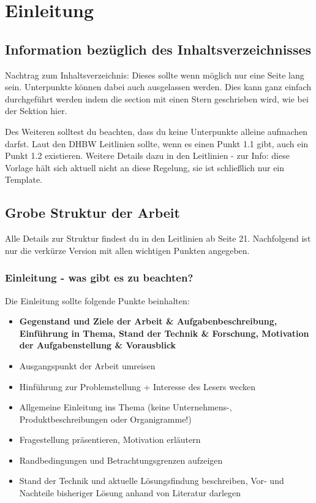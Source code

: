 \chapter{Einleitung}

\section*{Information bezüglich des Inhaltsverzeichnisses}
Nachtrag zum Inhaltsverzeichnis: Dieses sollte wenn möglich nur eine Seite lang sein. Unterpunkte können dabei auch ausgelassen werden. Dies kann ganz einfach durchgeführt werden indem die section mit einen Stern geschrieben wird, wie bei der Sektion hier.

Des Weiteren solltest du beachten, dass du keine Unterpunkte alleine aufmachen darfst. Laut den DHBW Leitlinien sollte, wenn es einen Punkt 1.1 gibt, auch ein Punkt 1.2 existieren. Weitere Details dazu in den Leitlinien - zur Info: diese Vorlage hält sich aktuell nicht an diese Regelung, sie ist schließlich nur ein Template.

\section{Grobe Struktur der Arbeit}
Alle Details zur Struktur findest du in den Leitlinien ab Seite 21. Nachfolgend ist nur die verkürze Version mit allen wichtigen Punkten angegeben.

\subsection{Einleitung - was gibt es zu beachten?}
Die Einleitung sollte folgende Punkte beinhalten:
\begin{itemize}
\item \textbf{Gegenstand und Ziele der Arbeit \& Aufgabenbeschreibung, Einführung in Thema, Stand der Technik \& Forschung, Motivation der Aufgabenstellung \& Vorausblick}
\item Ausgangspunkt der Arbeit umreisen
\item Hinführung zur Problemstellung + Interesse des Lesers wecken
\item Allgemeine Einleitung ins Thema (keine Unternehmens-, Produktbeschreibungen oder Organigramme!)
\item Fragestellung präsentieren, Motivation erläutern
\item Randbedingungen und Betrachtungsgrenzen aufzeigen
\item Stand der Technik und aktuelle Lösungsfindung beschreiben, Vor- und Nachteile bisheriger Lösung anhand von Literatur darlegen
\end{itemize}

